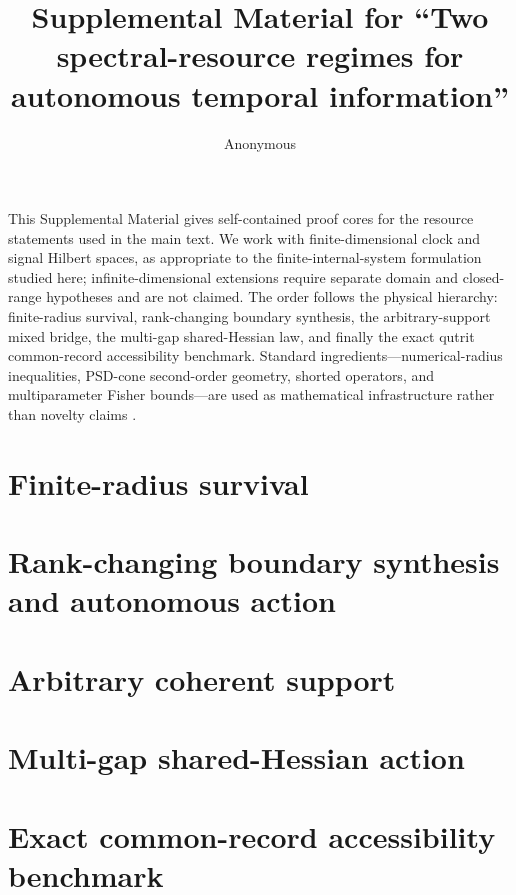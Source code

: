 \documentclass[aps,pra,preprint,nofootinbib]{revtex4-2}
\begin{document}
\title{Supplemental Material for ``Two spectral-resource regimes for autonomous temporal information''}
\author{Anonymous}
\maketitle

This Supplemental Material gives self-contained proof cores for the resource statements used in the main text. We work with finite-dimensional clock and signal Hilbert spaces, as appropriate to the finite-internal-system formulation studied here; infinite-dimensional extensions require separate domain and closed-range hypotheses and are not claimed. The order follows the physical hierarchy: finite-radius survival, rank-changing boundary synthesis, the arbitrary-support mixed bridge, the multi-gap shared-Hessian law, and finally the exact qutrit common-record accessibility benchmark. Standard ingredients---numerical-radius inequalities, PSD-cone second-order geometry, shorted operators, and multiparameter Fisher bounds---are used as mathematical infrastructure rather than novelty claims \cite{BhatiaJain2023,Shapiro1997,BonnansCominettiShapiro1999,AndersonTrapp1975,BraunsteinCaves1994,GillMassar2000}.

\section{Finite-radius survival}


\section{Rank-changing boundary synthesis and autonomous action}


\section{Arbitrary coherent support}


\section{Multi-gap shared-Hessian action}


\section{Exact common-record accessibility benchmark}


\end{document}
